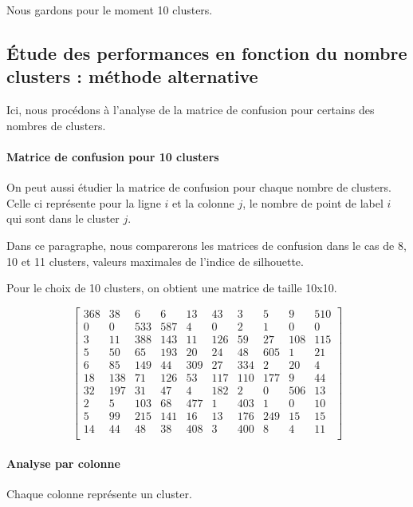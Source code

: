 \documentclass[french,a4paper,18pt]{article}
\begin{document}
Nous gardons pour le moment 10 clusters.

\subsection{Étude des performances en fonction du nombre clusters : méthode alternative}

Ici, nous procédons à l'analyse de la matrice de confusion pour certains des nombres de clusters.


\paragraph{Matrice de confusion pour 10 clusters}
On peut aussi étudier la matrice de confusion pour chaque nombre de clusters.
Celle ci représente pour la ligne $i$ et la colonne $j$, le nombre de point de label $i$ qui sont dans le cluster $j$.

Dans ce paragraphe, nous comparerons les matrices de confusion dans le cas de 8, 10 et 11 clusters, valeurs maximales de l'indice de silhouette.

Pour le choix de 10 clusters, on obtient une matrice de taille 10x10.

\[
\begin{bmatrix}
368 & 38 & 6 & 6 & 13 & 43 & 3 & 5 & 9 & 510 \\
0 & 0 & 533 & 587 & 4 & 0 & 2 & 1 & 0 & 0 \\
3 & 11 & 388 & 143 & 11 & 126 & 59 & 27 & 108 & 115 \\
5 & 50 & 65 & 193 & 20 & 24 & 48 & 605 & 1 & 21 \\
6 & 85 & 149 & 44 & 309 & 27 & 334 & 2 & 20 & 4 \\
18 & 138 & 71 & 126 & 53 & 117 & 110 & 177 & 9 & 44 \\
32 & 197 & 31 & 47 & 4 & 182 & 2 & 0 & 506 & 13 \\
2 & 5 & 103 & 68 & 477 & 1 & 403 & 1 & 0 & 10 \\
5 & 99 & 215 & 141 & 16 & 13 & 176 & 249 & 15 & 15 \\
14 & 44 & 48 & 38 & 408 & 3 & 400 & 8 & 4 & 11 \\
\end{bmatrix}
\]

\paragraph{Analyse par colonne}
Chaque colonne représente un cluster.
\end{document}
